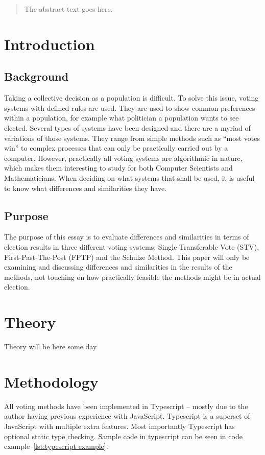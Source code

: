 \documentclass[12pt]{article}
\begin{document}


\pagebreak

\begin{abstract}
	The abstract text goes here.
\end{abstract}

\pagebreak

\tableofcontents

\pagebreak

\section{Introduction}
\subsection{Background}
Taking a collective decision as a population is difficult. To solve this issue, voting systems with defined rules are used. They are used to show common preferences within a population, for example what politician a population wants to see elected. Several types of systems have been designed and there are a myriad of variations of those systems. They range from simple methods such as “most votes win” to complex processes that can only be practically carried out by a computer. However, practically all voting systems are algorithmic in nature, which makes them interesting to study for both Computer Scientists and Mathematicians. When deciding on what systems that shall be used, it is useful to know what differences and similarities they have.
\subsection{Purpose}
The purpose of this essay is to evaluate differences and similarities in terms of election results in three different voting systems: Single Transferable Vote (STV), First-Past-The-Post (FPTP) and the Schulze Method. This paper will only be examining and discussing differences and similarities in the results of the methods, not touching on how practically feasible the methods might be in actual election.
\pagebreak
\section{Theory}
Theory will be here some day
\pagebreak
\section{Methodology}
All voting methods have been implemented in Typescript – mostly due to the author having previous experience with JavaScript. Typescript is a superset of JavaScript with multiple extra features. Most importantly Typescript has optional static type checking. Sample code in typescript can be seen in code example~\ref{lst:typescript example}.
\end{document}
